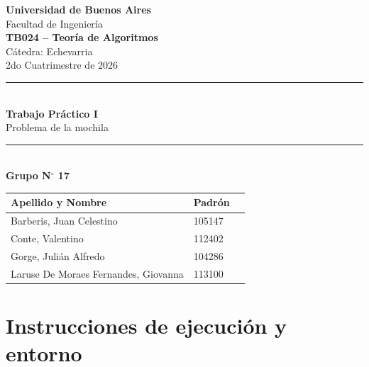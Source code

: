 \documentclass[11pt,a4paper]{article}
\begin{document}
\begin{titlepage}
    \centering
    \vspace*{1cm}

    {\Huge \textbf{Universidad de Buenos Aires}}\\[0.3cm]
    {\LARGE Facultad de Ingeniería}\\[1.5cm]

    {\Large \textbf{TB024 -- Teoría de Algoritmos}}\\[0.2cm]
    {\large Cátedra: Echevarria}\\[0.2cm]
    {\large 2do Cuatrimestre de 2026}\\[2cm]

    \rule{\linewidth}{0.5mm}\\[0.4cm]
    {\Huge \textbf{Trabajo Práctico I}}\\[0.3cm]
    {\Large Problema de la mochila}\\[0.4cm]
    \rule{\linewidth}{0.5mm}\\[2.5cm]

    \textbf{\large Grupo N$^\circ$ 17}\\[0.8cm]

    \begin{tabular}{llr}
        \toprule
        \textbf{Apellido y Nombre} & \textbf{Padrón} \\
        \midrule
        Barberis, Juan Celestino & 105147 \\
        Conte, Valentino & 112402 \\
        Gorge, Julián Alfredo & 104286 \\
        Laruse De Moraes Fernandes, Giovanna & 113100 \\
        \bottomrule
    \end{tabular}

    \vfill
\end{titlepage}

\tableofcontents
\newpage

\section{Instrucciones de ejecución y entorno}
\label{sec:entorno}
\end{document}

